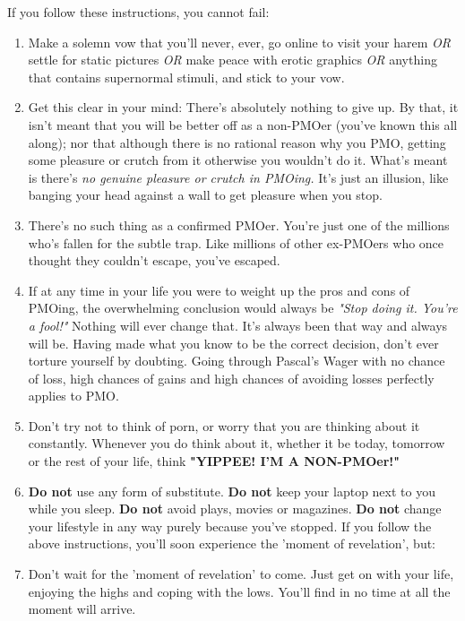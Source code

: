 \documentclass[easypeasy.tex]{subfiles}
\begin{document}
  If you follow these instructions, you cannot fail:
\begin{enumerate}
  \item Make a solemn vow that you'll never, ever, go online to visit your harem \textit{OR} settle for static pictures \textit{OR} make peace with erotic graphics \textit{OR} anything that contains supernormal stimuli, and stick to your vow.

    \item Get this clear in your mind: There's absolutely nothing to give up. By that, it isn't meant that you will be better off as a non-PMOer (you've known this all along); nor that although there is no rational reason why you PMO, getting some pleasure or crutch from it otherwise you wouldn't do it. What's meant is there's \textit{no genuine pleasure or crutch in PMOing.} It's just an illusion, like banging your head against a wall to get pleasure when you stop.

    \item There's no such thing as a confirmed PMOer. You're just one of the millions who's fallen for the subtle trap. Like millions of other ex-PMOers who once thought they couldn't escape, you've escaped.

    \item If at any time in your life you were to weight up the pros and cons of PMOing, the overwhelming conclusion would always be \textit{"Stop doing it. You're a fool!"} Nothing will ever change that. It's always been that way and always will be. Having made what you know to be the correct decision, don't ever torture yourself by doubting. Going through Pascal's Wager with no chance of loss, high chances of gains and high chances of avoiding losses perfectly applies to PMO.

    \item Don't try not to think of porn, or worry that you are thinking about it constantly. Whenever you do think about it, whether it be today, tomorrow or the rest of your life, think \textbf{"YIPPEE! I'M A NON-PMOer!"}

    \item \textbf{Do not} use any form of substitute. \textbf{Do not} keep your laptop next to you while you sleep. \textbf{Do not} avoid plays, movies or magazines. \textbf{Do not} change your lifestyle in any way purely because you've stopped. If you follow the above instructions, you'll soon experience the 'moment of revelation', but:

    \item Don't wait for the 'moment of revelation' to come. Just get on with your life, enjoying the highs and coping with the lows. You'll find in no time at all the moment will arrive.
\end{enumerate}
\end{document}
